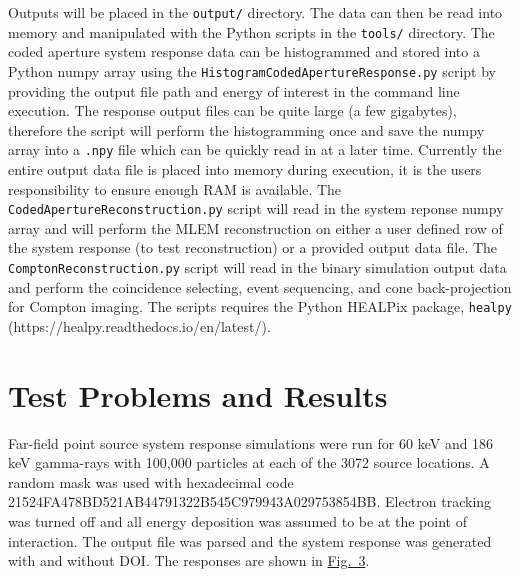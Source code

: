 \documentclass[10pt]{article}
\begin{document}
Outputs will be placed in the \verb!output/! directory. The data can then be read into memory and manipulated with the Python scripts in the \verb!tools/! directory. The coded aperture system response data can be histogrammed and stored into a Python numpy array using the \verb!HistogramCodedApertureResponse.py! script by providing the output file path and energy of interest in the command line execution. The response output files can be quite large (a few gigabytes), therefore the script will perform the histogramming once and save the numpy array into a \verb!.npy! file which can be quickly read in at a later time. Currently the entire output data file is placed into memory during execution, it is the users responsibility to ensure enough RAM is available. The \verb!CodedApertureReconstruction.py! script will read in the system reponse numpy array and will perform the MLEM reconstruction on either a user defined row of the system response (to test reconstruction) or a provided output data file. The \verb!ComptonReconstruction.py! script will read in the binary simulation output data and perform the coincidence selecting, event sequencing, and cone back-projection for Compton imaging. The scripts requires the Python HEALPix package, \verb!healpy! (https://healpy.readthedocs.io/en/latest/).





\section{Test Problems and Results}

Far-field point source system response simulations were run for 60 keV and 186 keV gamma-rays with 100,000 particles at each of the 3072 source locations. A random mask was used with hexadecimal code 21524FA478BD521AB44791322B545C979943A029753854BB. Electron tracking was turned off and all energy deposition was assumed to be at the point of interaction. The output file was parsed and the system response was generated with and without DOI. The responses are shown in \hyperlink{fig3}{Fig.~3}.
\end{document}
